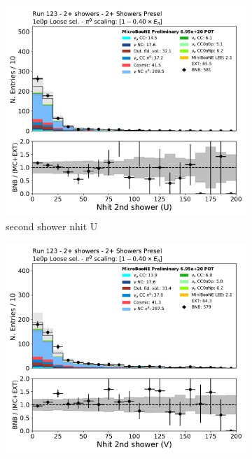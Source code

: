 \begin{figure}[H]
    \centering
    \begin{subfigure}{0.3\textwidth}
    \includegraphics[width=1.0\textwidth]{Sidebands/Figures/TwoShr_1e0pSel/loose/secondshower_U_nhit.pdf}
    \caption{second shower nhit U}
    \end{subfigure}
    \begin{subfigure}{0.3\textwidth}
    \includegraphics[width=1.0\textwidth]{Sidebands/Figures/TwoShr_1e0pSel/loose/secondshower_V_nhit.pdf}

\end{subfigure}
\end{figure}
